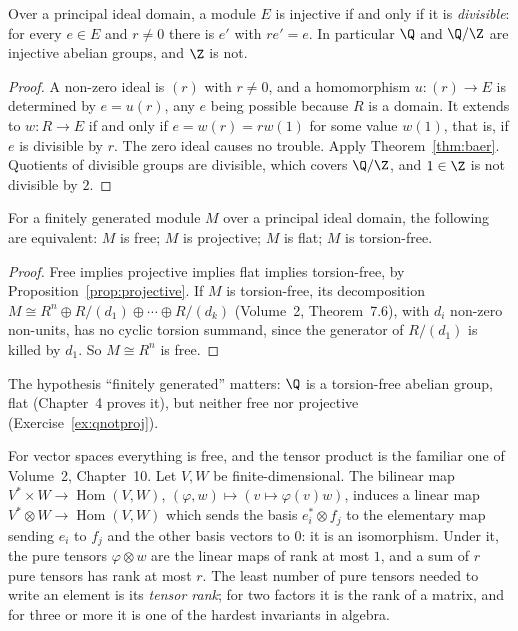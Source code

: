 \begin{corollary}\label{cor:divisible}
Over a principal ideal domain, a module $E$ is injective if and only if it is \emph{divisible}: for every $e\in E$ and $r\ne0$ there is $e'$ with $re'=e$. In particular $\Q$ and $\Q/\Z$ are injective abelian groups, and $\Z$ is not.
\end{corollary}

\begin{proof}
A non-zero ideal is $(r)$ with $r\ne0$, and a homomorphism $u\colon(r)\to E$ is determined by $e=u(r)$, any $e$ being possible because $R$ is a domain. It extends to $w\colon R\to E$ if and only if $e=w(r)=rw(1)$ for some value $w(1)$, that is, if
$e$ is divisible by $r$. The zero ideal causes no trouble. Apply Theorem~\ref{thm:baer}. Quotients of divisible groups are divisible, which covers $\Q/\Z$, and $1\in\Z$ is not divisible by $2$.
\end{proof}

\begin{theorem}\label{thm:pidflat}
For a finitely generated module $M$ over a principal ideal domain, the following are equivalent: $M$ is free; $M$ is projective; $M$ is flat; $M$ is torsion-free.
\end{theorem}

\begin{proof}
Free implies projective implies flat implies torsion-free, by Proposition~\ref{prop:projective}. If $M$ is torsion-free, its decomposition $M\cong R^n\oplus R/(d_1)\oplus\cdots\oplus R/(d_k)$ (Volume~2, Theorem~7.6), with $d_i$ non-zero non-units,
has no cyclic torsion summand, since the generator of $R/(d_1)$ is killed by $d_1$. So $M\cong R^n$ is free.
\end{proof}

The hypothesis ``finitely generated'' matters: $\Q$ is a torsion-free abelian group, flat (Chapter~4 proves it), but neither free nor projective (Exercise~\ref{ex:qnotproj}).

For vector spaces everything is free, and the tensor product is the familiar one of Volume~2, Chapter~10. Let $V,W$ be finite-dimensional. The bilinear map $V^*\times W\to\operatorname{Hom}(V,W)$, $(\varphi,w)\mapsto(v\mapsto\varphi(v)w)$, induces a
linear map $V^*\otimes W\to\operatorname{Hom}(V,W)$ which sends the basis $e_i^*\otimes f_j$ to the elementary map sending $e_i$ to $f_j$ and the other basis vectors to $0$: it is an isomorphism. Under it, the pure tensors
$\varphi\otimes w$ are the linear maps of rank at most $1$, and a sum of $r$ pure tensors has rank at most $r$. The least number of pure tensors needed to write an element is its \emph{tensor rank}; for two factors it is the
rank of a matrix, and for three or more it is one of the hardest invariants in algebra.

